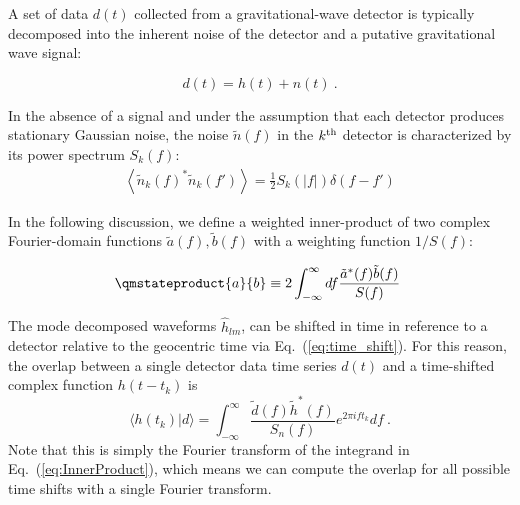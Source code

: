 \label{sec:Methods}



%
%


A set of data $d(t)$ collected from a gravitational-wave detector is typically decomposed into the inherent noise of the detector and a putative gravitational wave signal:

\begin{equation}
d(t) = h(t) + n(t)\ .
\end{equation}

In the absence of a signal and under the assumption that each detector produces stationary Gaussian noise, the noise $\tilde{n}(f)$ in the $k^{\rm th}$ detector is characterized by its power spectrum $S_k(f)$:
\begin{eqnarray}
\left<\tilde{n}_k(f)^* \tilde{n}_k(f')\right> = \frac{1}{2} S_k(|f|) \delta(f-f')
\end{eqnarray}

In the following discussion, we define a weighted inner-product of two complex Fourier-domain functions $\tilde{a}(f), \tilde{b}(f)$ with a weighting function $1/S(f)$:

\begin{eqnarray} \label{eq:InnerProduct}
\qmstateproduct{a}{b} \equiv 2 \int_{-\infty}^{\infty} df \frac{\tilde{a}^*(f)\tilde{b}(f)}{S(f)}\
\end{eqnarray}

The mode decomposed waveforms $\hat{h}_{lm}$, can be shifted in time in reference 
to a detector relative to the geocentric time via Eq.~(\ref{eq:time_shift}). 
For this reason, the overlap between a single detector data time series  
$d(t)$ and a time-shifted complex function $h(t-t_k)$ is 
\begin{equation} \label{eq:IFFT}
\langle h(t_k) | d \rangle = \int_{-\infty}^{\infty} \frac{\tilde{d}(f) \tilde{h}^*(f)}{S_n(f)} e^{2\pi i f t_k} df \ .
\end{equation}
Note that this is simply the Fourier transform of the integrand in Eq.~(\ref{eq:InnerProduct}), 
which means we can compute the overlap for all possible time shifts with a single
Fourier transform.



